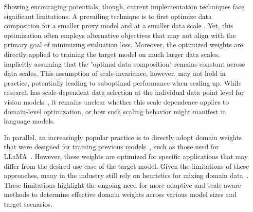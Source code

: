 \documentclass{article} %
\begin{document}
Showing encouraging potentials, though, current implementation techniques face significant limitations. A prevailing technique is to first optimize data composition for a smaller proxy model and at a smaller data scale \citep{xie2024doremi,fan2023doge,ye2024data,liu2024regmix}. Yet, this optimization often employs alternative objectives that may not align with the primary goal of minimizing evaluation loss. Moreover, the optimized weights are directly applied to training the target model on much larger data scales, implicitly assuming that the "optimal data composition" remains constant across data scales. This assumption of scale-invariance, however, may not hold in practice, potentially leading to suboptimal performance when scaling up. While research has scale-dependent data selection at the individual data point level for vision models~\citep{sorscher2022beyond,goyal2024science}, it remains unclear whether this scale dependence applies to domain-level optimization, or how such scaling behavior might manifest in language models.


In parallel, an increasingly popular practice is to directly adopt domain weights that were designed for training previous models~\citep{mehta2024openelm}, such as those used for LLaMA~\citep{touvron2023llama}.
However, these weights are optimized for specific applications that may differ from the desired use case of the target model. Given the limitations of these approaches, many in the industry still rely on heuristics for mixing domain data~\citep{mckinzie2024mm1, mehta2024openelm,rae2021scaling}. These limitations highlight the ongoing need for more adaptive and scale-aware methods to determine effective domain weights across various model sizes and target scenarios. 





\end{document}
